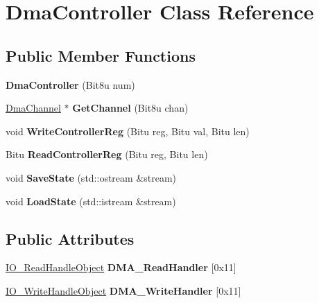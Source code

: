 \hypertarget{classDmaController}{\section{Dma\-Controller Class Reference}
\label{classDmaController}
}
\subsection*{Public Member Functions}
\begin{DoxyCompactItemize}
\item 
\hypertarget{classDmaController_a30d3a9f46dd43dd2135e48f03a47d2fd}{{\bfseries Dma\-Controller} (Bit8u num)}\label{classDmaController_a30d3a9f46dd43dd2135e48f03a47d2fd}

\item 
\hypertarget{classDmaController_a43703c996fcc2913b8a3e41fc472abcf}{\hyperlink{classDmaChannel}{Dma\-Channel} $\ast$ {\bfseries Get\-Channel} (Bit8u chan)}\label{classDmaController_a43703c996fcc2913b8a3e41fc472abcf}

\item 
\hypertarget{classDmaController_a9b1c5a36779958c5f41538fc14c7ab5c}{void {\bfseries Write\-Controller\-Reg} (Bitu reg, Bitu val, Bitu len)}\label{classDmaController_a9b1c5a36779958c5f41538fc14c7ab5c}

\item 
\hypertarget{classDmaController_a1941d446f787328736f8fe4652f5b1aa}{Bitu {\bfseries Read\-Controller\-Reg} (Bitu reg, Bitu len)}\label{classDmaController_a1941d446f787328736f8fe4652f5b1aa}

\item 
\hypertarget{classDmaController_a43ae45635a4bb1bcca49b6675a04f132}{void {\bfseries Save\-State} (std\-::ostream \&stream)}\label{classDmaController_a43ae45635a4bb1bcca49b6675a04f132}

\item 
\hypertarget{classDmaController_a692d89f0eeb164eca32fa293ffbffe0f}{void {\bfseries Load\-State} (std\-::istream \&stream)}\label{classDmaController_a692d89f0eeb164eca32fa293ffbffe0f}

\end{DoxyCompactItemize}
\subsection*{Public Attributes}
\begin{DoxyCompactItemize}
\item 
\hypertarget{classDmaController_a1d64f9d70ce684b377537ab47c68ed1e}{\hyperlink{classIO__ReadHandleObject}{I\-O\-\_\-\-Read\-Handle\-Object} {\bfseries D\-M\-A\-\_\-\-Read\-Handler} \mbox{[}0x11\mbox{]}}\label{classDmaController_a1d64f9d70ce684b377537ab47c68ed1e}

\item 
\hypertarget{classDmaController_aa16f89d7f6dcb699787256e0de7abbc2}{\hyperlink{classIO__WriteHandleObject}{I\-O\-\_\-\-Write\-Handle\-Object} {\bfseries D\-M\-A\-\_\-\-Write\-Handler} \mbox{[}0x11\mbox{]}}\label{classDmaController_aa16f89d7f6dcb699787256e0de7abbc2}

\end{DoxyCompactItemize}


